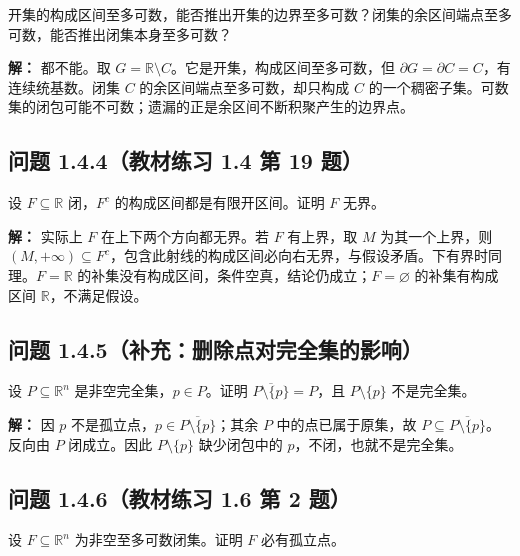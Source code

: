 \documentclass[11pt,a4paper]{article}
\begin{document}
开集的构成区间至多可数，能否推出开集的边界至多可数？闭集的余区间端点至多可数，能否推出闭集本身至多可数？

\textbf{解：} 都不能。取
\(G=\mathbb R\setminus C\)。它是开集，构成区间至多可数，但
\(\partial G=\partial C=C\)，有连续统基数。闭集 \(C\)
的余区间端点至多可数，却只构成 \(C\)
的一个稠密子集。可数集的闭包可能不可数；遗漏的正是余区间不断积聚产生的边界点。

\subsection{问题 1.4.4（教材练习 1.4 第 19
题）}\label{ux95eeux9898-1.4.4ux6559ux6750ux7ec3ux4e60-1.4-ux7b2c-19-ux9898}

设 \(F\subseteq\mathbb R\) 闭，\(F^c\) 的构成区间都是有限开区间。证明
\(F\) 无界。

\textbf{解：} 实际上 \(F\) 在上下两个方向都无界。若 \(F\) 有上界，取
\(M\) 为其一个上界，则
\((M,+\infty)\subseteq F^c\)，包含此射线的构成区间必向右无界，与假设矛盾。下有界时同理。\(F=\mathbb R\)
的补集没有构成区间，条件空真，结论仍成立；\(F=\varnothing\)
的补集有构成区间 \(\mathbb R\)，不满足假设。

\subsection{问题
1.4.5（补充：删除点对完全集的影响）}\label{ux95eeux9898-1.4.5ux8865ux5145ux5220ux9664ux70b9ux5bf9ux5b8cux5168ux96c6ux7684ux5f71ux54cd}

设 \(P\subseteq\mathbb R^n\) 是非空完全集，\(p\in P\)。证明
\(\overline{P\setminus\{p\}}=P\)，且 \(P\setminus\{p\}\) 不是完全集。

\textbf{解：} 因 \(p\)
不是孤立点，\(p\in\overline{P\setminus\{p\}}\)；其余 \(P\)
中的点已属于原集，故 \(P\subseteq\overline{P\setminus\{p\}}\)。反向由
\(P\) 闭成立。因此 \(P\setminus\{p\}\) 缺少闭包中的
\(p\)，不闭，也就不是完全集。

\subsection{问题 1.4.6（教材练习 1.6 第 2
题）}\label{ux95eeux9898-1.4.6ux6559ux6750ux7ec3ux4e60-1.6-ux7b2c-2-ux9898}

设 \(F\subseteq\mathbb R^n\) 为非空至多可数闭集。证明 \(F\) 必有孤立点。
\end{document}
